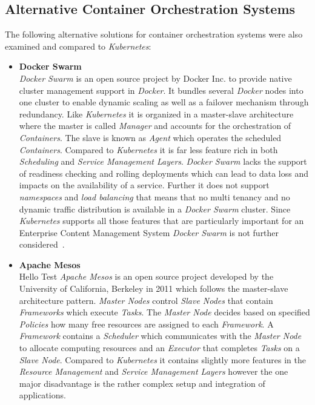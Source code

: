 \subsection{Alternative Container Orchestration Systems}
The following alternative solutions for container orchestration systems were also examined and compared to \textit{Kubernetes}:
\begin{itemize}
    \item[]{\textbf{Docker Swarm}\\
    \textit{Docker Swarm} is an open source project by Docker Inc. to provide native cluster management support in \textit{Docker}.
    It bundles several \textit{Docker} nodes into one cluster to enable dynamic scaling as well as a failover mechanism through redundancy.
    Like \textit{Kubernetes} it is organized in a master-slave architecture where the master is called \textit{Manager} and accounts for the orchestration of \textit{Containers}.
    The slave is known as \textit{Agent} which operates the scheduled \textit{Containers}.
    Compared to \textit{Kubernetes} it is far less feature rich in both \textit{Scheduling} and \textit{Service Management Layers}.
    \textit{Docker Swarm} lacks the support of readiness checking and rolling deployments which can lead to data loss and impacts on the availability of a service.
    Further it does not support \textit{namespaces} and \textit{load balancing} that means that no multi tenancy and no dynamic traffic distribution is available in a \textit{Docker Swarm} cluster.
    Since \textit{Kubernetes} supports all those features that are particularly important for an Enterprise Content Management System \textit{Docker Swarm} is not further considered~\cite{docker2, Orch2}.
    }
    \item[]{\textbf{Apache Mesos}\\
    Hello Test
    \textit{Apache Mesos} is an open source project developed by the University of California, Berkeley in 2011 which follows the master-slave architecture pattern.
    \textit{Master Nodes} control \textit{Slave Nodes} that contain \textit{Frameworks} which execute \textit{Tasks}.
    The \textit{Master Node} decides based on specified \textit{Policies} how many free resources are assigned to each \textit{Framework}.
    A \textit{Framework} contains a \textit{Scheduler} which communicates with the \textit{Master Node} to allocate computing resources and an \textit{Executor} that completes \textit{Tasks} on a \textit{Slave Node}.
    Compared to \textit{Kubernetes} it contains slightly more features in the \textit{Resource Management} and \textit{Service Management Layers} however the one major disadvantage is the rather complex setup and integration of applications.
}
\end{itemize}
